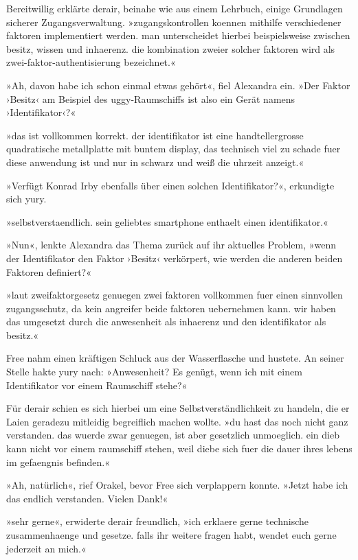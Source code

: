 Bereitwillig erklärte derair, beinahe wie aus einem Lehrbuch, einige Grundlagen sicherer Zugangsverwaltung. »zugangskontrollen koennen mithilfe verschiedener faktoren implementiert werden. man unterscheidet hierbei beispielsweise zwischen besitz, wissen und inhaerenz. die kombination zweier solcher faktoren wird als zwei-faktor-authentisierung bezeichnet.«

»Ah, davon habe ich schon einmal etwas gehört«, fiel Alexandra ein. »Der Faktor ›Besitz‹ am Beispiel des uggy-Raumschiffs ist also ein Gerät namens ›Identifikator‹?«

»das ist vollkommen korrekt. der identifikator ist eine handtellergrosse quadratische metallplatte mit buntem display, das technisch viel zu schade fuer diese anwendung ist und nur in schwarz und weiß die uhrzeit anzeigt.«

»Verfügt Konrad Irby ebenfalls über einen solchen Identifikator?«, erkundigte sich yury.

»selbstverstaendlich. sein geliebtes smartphone enthaelt einen identifikator.«

»Nun«, lenkte Alexandra das Thema zurück auf ihr aktuelles Problem, »wenn der Identifikator den Faktor ›Besitz‹ verkörpert, wie werden die anderen beiden Faktoren definiert?«

»laut zweifaktorgesetz genuegen zwei faktoren vollkommen fuer einen sinnvollen zugangsschutz, da kein angreifer beide faktoren uebernehmen kann. wir haben das umgesetzt durch die anwesenheit als inhaerenz und den identifikator als besitz.«

Free nahm einen kräftigen Schluck aus der Wasserflasche und hustete. An seiner Stelle hakte yury nach: »Anwesenheit? Es genügt, wenn ich mit einem Identifikator vor einem Raumschiff stehe?«

Für derair schien es sich hierbei um eine Selbstverständlichkeit zu handeln, die er Laien geradezu mitleidig begreiflich machen wollte. »du hast das noch nicht ganz verstanden. das wuerde zwar genuegen, ist aber gesetzlich unmoeglich. ein dieb kann nicht vor einem raumschiff stehen, weil diebe sich fuer die dauer ihres lebens im gefaengnis befinden.«

»Ah, natürlich«, rief Orakel, bevor Free sich verplappern konnte. »Jetzt habe ich das endlich verstanden. Vielen Dank!«

»sehr gerne«, erwiderte derair freundlich, »ich erklaere gerne technische zusammenhaenge und gesetze. falls ihr weitere fragen habt, wendet euch gerne jederzeit an mich.«

